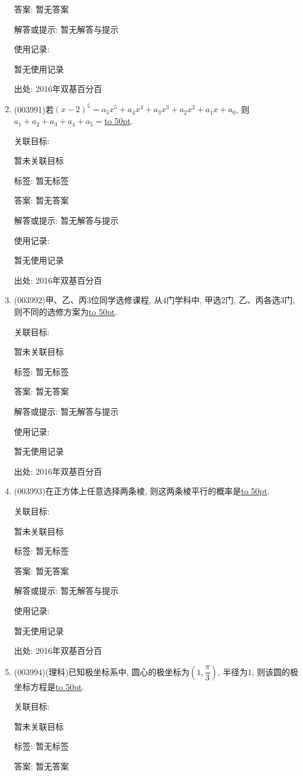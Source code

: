 \documentclass[10pt,a4paper]{article}
\newcommand{\blank}[1]{\underline{\hbox to #1pt{}}}
\begin{document}
\begin{enumerate}[1.]
答案: 暂无答案

解答或提示: 暂无解答与提示

使用记录:

暂无使用记录


出处: 2016年双基百分百
\item { (003991)}若$(x-2)^5=a_5x^5+a_4x^4+a_3x^3+a_2x^2+a_1x+a_0$, 则$a_1+a_2+a_3+a_4+a_5=$\blank{50}.


关联目标:

暂未关联目标



标签: 暂无标签

答案: 暂无答案

解答或提示: 暂无解答与提示

使用记录:

暂无使用记录


出处: 2016年双基百分百
\item { (003992)}甲、乙、丙$3$位同学选修课程, 从$4$门学科中, 甲选$2$门, 乙、丙各选$3$门, 则不同的选修方案为\blank{50}.


关联目标:

暂未关联目标



标签: 暂无标签

答案: 暂无答案

解答或提示: 暂无解答与提示

使用记录:

暂无使用记录


出处: 2016年双基百分百
\item { (003993)}在正方体上任意选择两条棱, 则这两条棱平行的概率是\blank{50}.


关联目标:

暂未关联目标



标签: 暂无标签

答案: 暂无答案

解答或提示: 暂无解答与提示

使用记录:

暂无使用记录


出处: 2016年双基百分百
\item { (003994)}(理科)已知极坐标系中, 圆心的极坐标为$\left(1,\dfrac{\pi}{3}\right)$, 半径为$1$, 则该圆的极坐标方程是\blank{50}.


关联目标:

暂未关联目标



标签: 暂无标签

答案: 暂无答案


\end{enumerate}
\end{document}
